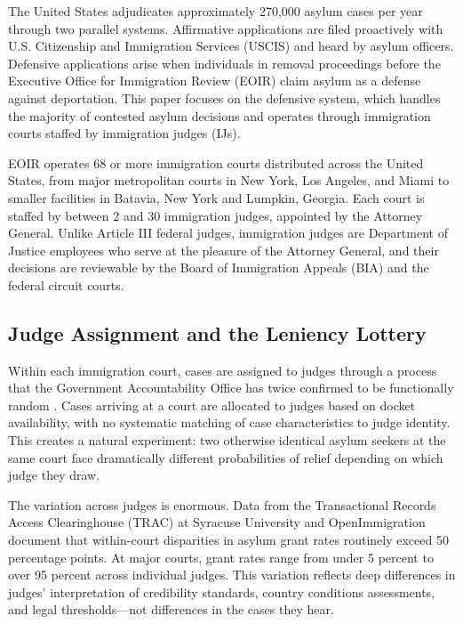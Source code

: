 \documentclass[12pt]{article}
\begin{document}
The United States adjudicates approximately 270,000 asylum cases per year through two parallel systems. Affirmative applications are filed proactively with U.S. Citizenship and Immigration Services (USCIS) and heard by asylum officers. Defensive applications arise when individuals in removal proceedings before the Executive Office for Immigration Review (EOIR) claim asylum as a defense against deportation. This paper focuses on the defensive system, which handles the majority of contested asylum decisions and operates through immigration courts staffed by immigration judges (IJs).

EOIR operates 68 or more immigration courts distributed across the United States, from major metropolitan courts in New York, Los Angeles, and Miami to smaller facilities in Batavia, New York and Lumpkin, Georgia. Each court is staffed by between 2 and 30 immigration judges, appointed by the Attorney General. Unlike Article III federal judges, immigration judges are Department of Justice employees who serve at the pleasure of the Attorney General, and their decisions are reviewable by the Board of Immigration Appeals (BIA) and the federal circuit courts.

\subsection{Judge Assignment and the Leniency Lottery}

Within each immigration court, cases are assigned to judges through a process that the Government Accountability Office has twice confirmed to be functionally random \citep{gao2008asylum, gao2017asylum}. Cases arriving at a court are allocated to judges based on docket availability, with no systematic matching of case characteristics to judge identity. This creates a natural experiment: two otherwise identical asylum seekers at the same court face dramatically different probabilities of relief depending on which judge they draw.

The variation across judges is enormous. Data from the Transactional Records Access Clearinghouse (TRAC) at Syracuse University and OpenImmigration document that within-court disparities in asylum grant rates routinely exceed 50 percentage points. At major courts, grant rates range from under 5 percent to over 95 percent across individual judges. This variation reflects deep differences in judges' interpretation of credibility standards, country conditions assessments, and legal thresholds---not differences in the cases they hear.
\end{document}

